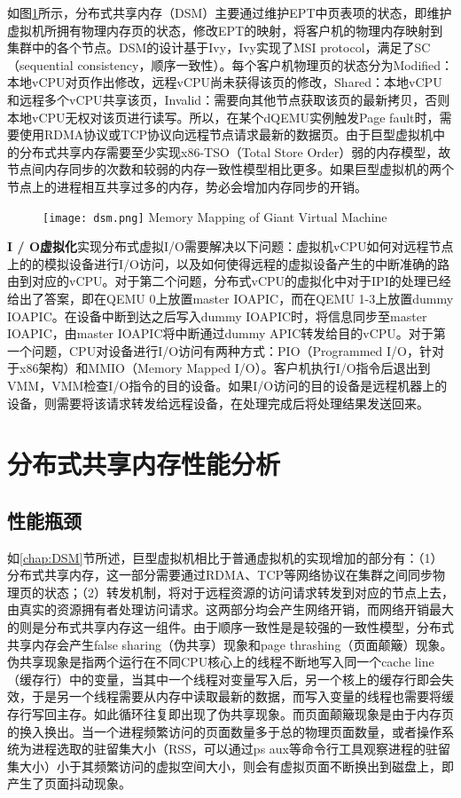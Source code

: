 如图\ref{fig:DSM}所示，分布式共享内存（DSM）主要通过维护EPT中页表项的状态，即维护虚拟机所拥有物理内存页的状态，修改EPT的映射，将客户机的物理内存映射到集群中的各个节点。DSM的设计基于Ivy\cite{ivy}，Ivy实现了MSI protocol，满足了SC（sequential consistency，顺序一致性）。每个客户机物理页的状态分为Modified：本地vCPU对页作出修改，远程vCPU尚未获得该页的修改，Shared：本地vCPU和远程多个vCPU共享该页，Invalid：需要向其他节点获取该页的最新拷贝，否则本地vCPU无权对该页进行读写。所以，在某个dQEMU实例触发Page fault时，需要使用RDMA协议或TCP协议向远程节点请求最新的数据页。由于巨型虚拟机中的分布式共享内存需要至少实现x86-TSO（Total Store Order）\cite{tso}弱的内存模型，故节点间内存同步的次数和较弱的内存一致性模型相比更多。如果巨型虚拟机的两个节点上的进程相互共享过多的内存，势必会增加内存同步的开销。
\label{chap:DSM}
\begin{figure}[!htp]
  \centering
  \texttt{[image: dsm.png]}
    {Memory Mapping of Giant Virtual Machine}
  \label{fig:DSM}
\end{figure}

\noindent\textbf{I / O虚拟化}\quad 实现分布式虚拟I/O需要解决以下问题：虚拟机vCPU如何对远程节点上的的模拟设备进行I/O访问，以及如何使得远程的虚拟设备产生的中断准确的路由到对应的vCPU。对于第二个问题，分布式vCPU的虚拟化中对于IPI的处理已经给出了答案，即在QEMU 0上放置master IOAPIC，而在QEMU 1-3上放置dummy IOAPIC。在设备中断到达之后写入dummy IOAPIC时，将信息同步至master IOAPIC，由master IOAPIC将中断通过dummy APIC转发给目的vCPU。对于第一个问题，CPU对设备进行I/O访问有两种方式：PIO（Programmed I/O，针对于x86架构）和MMIO（Memory Mapped I/O）。客户机执行I/O指令后退出到VMM，VMM检查I/O指令的目的设备。如果I/O访问的目的设备是远程机器上的设备，则需要将该请求转发给远程设备，在处理完成后将处理结果发送回来。

\section{分布式共享内存性能分析}
\subsection{性能瓶颈}
\label{chap:bottle}
如\ref{chap:DSM}节所述，巨型虚拟机相比于普通虚拟机的实现增加的部分有：（1）分布式共享内存，这一部分需要通过RDMA、TCP等网络协议在集群之间同步物理页的状态；（2）转发机制，将对于远程资源的访问请求转发到对应的节点上去，由真实的资源拥有者处理访问请求。这两部分均会产生网络开销，而网络开销最大的则是分布式共享内存这一组件。由于顺序一致性是是较强的一致性模型，分布式共享内存会产生false sharing（伪共享）现象和page thrashing（页面颠簸）现象\cite{sharing}。伪共享现象是指两个运行在不同CPU核心上的线程不断地写入同一个cache line（缓存行）中的变量，当其中一个线程对变量写入后，另一个核上的缓存行即会失效，于是另一个线程需要从内存中读取最新的数据，而写入变量的线程也需要将缓存行写回主存。如此循环往复即出现了伪共享现象。而页面颠簸现象是由于内存页的换入换出。当一个进程频繁访问的页面数量多于总的物理页面数量，或者操作系统为进程选取的驻留集大小（RSS，可以通过ps aux等命令行工具观察进程的驻留集大小）小于其频繁访问的虚拟空间大小，则会有虚拟页面不断换出到磁盘上，即产生了页面抖动现象。

